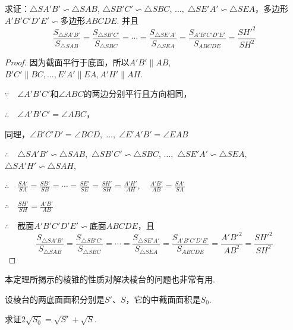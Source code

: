 求证：$\triangle SA'B'\backsim \triangle SAB$, $\triangle SB'C'\backsim  \triangle SBC$, $\ldots,\;\triangle SE'A'\backsim \triangle SEA$，多边形$A'B'C'D'E'\backsim $多边形$ABCDE$. 并且
\[
\frac{S_{\triangle SA'B'}}{S_{\triangle SAB}}=\frac{S_{\triangle SB'C'}}{S_{\triangle SBC}}=\cdots=\frac{S_{\triangle SE'A'}}{S_{\triangle SEA}}=\frac{S_{A'B'C'D'E'}}{S_{ABCDE}}=\frac{{SH'}^2}{SH^2}
\]

\begin{proof}
因为截面平行于底面，所以$A'B'\parallel AB$, $B'C'\parallel BC,\ldots,E'A' \parallel EA,A'H'\parallel AH$. 

$\because\quad \angle A'B'C'$和$\angle ABC$的两边分别平行且方向相同，

$\therefore\quad \angle A'B'C'=\angle ABC$，

同理，$\angle B'C'D'= \angle BCD,\; \ldots,\; \angle E'A'B'=\angle EAB$

$\therefore\quad \triangle SA'B'\backsim \triangle SAB,$\; $\triangle SB'C'\backsim \triangle SBC$,\; $\ldots,$\; $\triangle SE'A'\backsim \triangle SEA,$\; $\triangle SA'H'\backsim \triangle SAH$,

$\therefore\quad \frac{SA'}{SA}=\frac{SB'}{SB}=\cdots=\frac{SE'}{SE}=\frac{SH'}{SH}=\frac{A'H'}{AH},\quad \frac{A'B'}{AB}=\frac{SA'}{SA}$

$\therefore\quad \frac{SH'}{SH}=\frac{A'B'}{AB}$

$\therefore\quad$截面$A'B'C'D'E'\backsim $底面$ABCDE$，且
\[
\frac{S_{\triangle SA'B'}}{S_{\triangle SAB}}=\frac{S_{\triangle SB'C'}}{S_{\triangle SBC}}=\cdots=\frac{S_{\triangle SE'A'}}{S_{\triangle SEA}}=\frac{S_{A'B'C'D'E'}}{S_{ABCDE}}=\frac{A'{B'}^2}{AB^2}=\frac{{SH'}^2}{SH^2}
\]
\end{proof}

\begin{note}
    本定理所揭示的棱锥的性质对解决棱台的问题也非常有用.
\end{note}

\begin{example}
设棱台的两底面面积分别是$S'$、$S$，它的中截面面积是$S_0$. 

求证$2\sqrt{S_0}=\sqrt{S'}+\sqrt{S}$.
\end{example}

